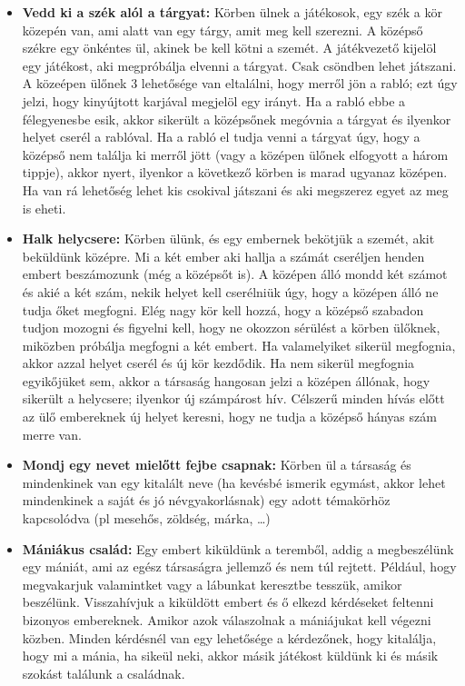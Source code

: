 \documentclass[a4paper, 12pt, twoside, openright]{article}
\begin{document}
\begin{itemize}
\item \textbf{Vedd ki a szék alól a tárgyat:} Körben ülnek a játékosok, egy szék a kör közepén van, ami alatt van egy tárgy, amit meg kell szerezni. A középső székre egy önkéntes ül, akinek be kell kötni a szemét. A játékvezető kijelöl egy játékost, aki megpróbálja elvenni a tárgyat. Csak csöndben lehet játszani. A közeépen ülőnek 3 lehetősége van eltalálni, hogy merről jön a rabló; ezt úgy jelzi, hogy kinyújtott karjával megjelöl egy irányt. Ha a rabló ebbe a félegyenesbe esik, akkor sikerült a középsőnek megóvnia a tárgyat és ilyenkor helyet cserél a rablóval. Ha a rabló el tudja venni a tárgyat úgy, hogy a középső nem találja ki merről jött (vagy a középen ülőnek elfogyott a három tippje), akkor nyert, ilyenkor a következő körben is marad ugyanaz középen. Ha van rá lehetőség lehet kis csokival játszani és aki megszerez egyet az meg is eheti.

\item \textbf{Halk helycsere:} Körben ülünk, és egy embernek bekötjük a szemét, akit beküldünk középre. Mi a két ember aki hallja a számát cseréljen henden embert beszámozunk (még a középsőt is). A középen álló mondd két számot és akié a két szám, nekik helyet kell cserélniük úgy, hogy a középen álló ne tudja őket megfogni. Elég nagy kör kell hozzá, hogy a középső szabadon tudjon mozogni és figyelni kell, hogy ne okozzon sérülést a körben ülőknek, miközben próbálja megfogni a két embert. Ha valamelyiket sikerül megfognia, akkor azzal helyet cserél és új kör kezdődik. Ha nem sikerül megfognia egyikőjüket sem, akkor a társaság hangosan jelzi a középen állónak, hogy sikerült a helycsere; ilyenkor új számpárost hív. Célszerű minden hívás előtt az ülő embereknek új helyet keresni, hogy ne tudja a középső hányas szám merre van.

\item \textbf{Mondj egy nevet mielőtt fejbe csapnak:} Körben ül a társaság és mindenkinek van egy kitalált neve (ha kevésbé ismerik egymást, akkor lehet mindenkinek a saját és jó névgyakorlásnak) egy adott témakörhöz kapcsolódva (pl mesehős, zöldség, márka, \dots)

\item \textbf{Mániákus család:} Egy embert kiküldünk a teremből, addig a megbeszélünk egy mániát, ami az egész társaságra jellemző és nem túl rejtett. Például, hogy megvakarjuk valamintket vagy a lábunkat keresztbe tesszük, amikor beszélünk. Visszahívjuk a kiküldött embert és ő elkezd kérdéseket feltenni bizonyos embereknek. Amikor azok válaszolnak a mániájukat kell végezni közben. Minden kérdésnél van egy lehetősége a kérdezőnek, hogy kitalálja, hogy mi a mánia, ha sikeül neki, akkor másik játékost küldünk ki és másik szokást találunk a családnak.


\end{itemize}
\end{document}
